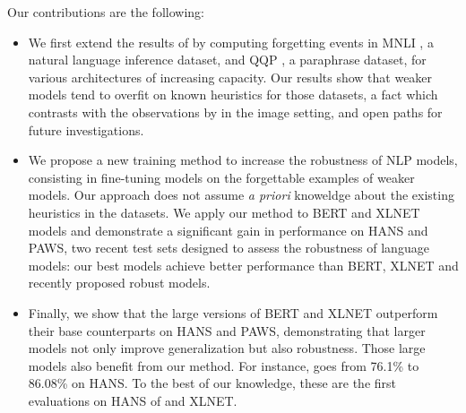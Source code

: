 \noindent
Our contributions are the following:
\begin{itemize}
    \item We first extend the results of  by computing forgetting events in MNLI \cite{williams2017broad}, a natural language inference dataset, and QQP \cite{qqp}, a paraphrase dataset, for various architectures of increasing capacity. Our results show that weaker models tend to overfit on known heuristics for those datasets, a fact which contrasts with the observations by  in the image setting, and open paths for future investigations.
    \item We propose a new training method to increase the robustness of NLP models, consisting in fine-tuning models on the forgettable examples of weaker models. Our approach does not assume \emph{a priori} knoweldge
    about the existing heuristics in the datasets. We apply our method to BERT and XLNET models and demonstrate a significant gain in performance on HANS and PAWS, two recent test sets designed to assess the robustness of language models: our best models achieve better performance than BERT, XLNET and recently proposed robust models.
    \item Finally, we show that the large versions of BERT and XLNET outperform their base counterparts on HANS and PAWS, demonstrating that larger models not only improve generalization but also robustness. Those large models also benefit from our method. For instance, \xlnetlarge goes from 76.1\% to 86.08\% on HANS. To the best of our knowledge, these are the first evaluations on HANS of \bertlarge and XLNET.
\end{itemize}


